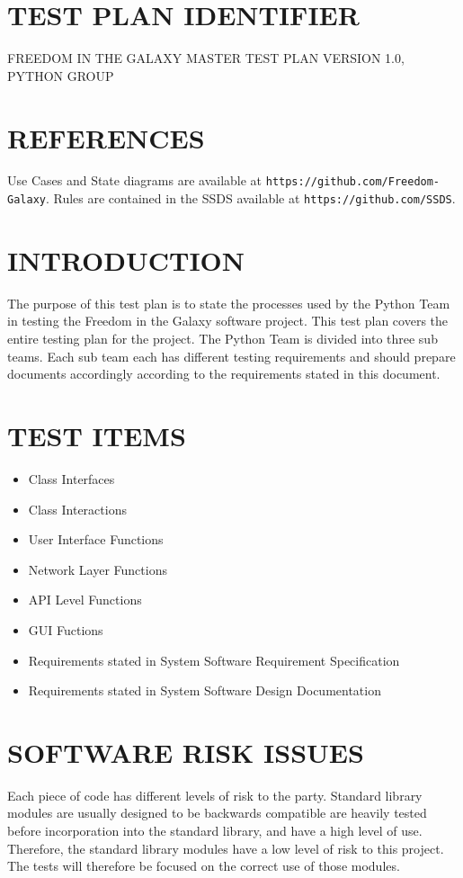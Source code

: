 \documentclass[report]{article}
\begin{document}
\section[IDENTIFIER]{TEST PLAN IDENTIFIER}
FREEDOM IN THE GALAXY MASTER TEST PLAN VERSION 1.0, PYTHON GROUP
\section[REFERENCES]{REFERENCES}
Use Cases and State diagrams are available at {\tt https://github.com/Freedom-Galaxy}. Rules are contained in the SSDS available at {\tt https://github.com/SSDS}.


\section[INTRODUCTION]{INTRODUCTION}
The purpose of this test plan is to state the processes used by the Python Team in testing the Freedom in the Galaxy software project. This test plan covers the entire testing plan for the project. The Python Team is divided into three sub teams. Each sub team each has different testing requirements and should prepare documents accordingly according to the requirements stated in this document.

\section[TEST ITEMS]{TEST ITEMS}
\begin{itemize}
\item Class Interfaces
\item Class Interactions
\item User Interface Functions
\item Network Layer Functions
\item API Level Functions
\item GUI Fuctions
\item Requirements stated in System Software Requirement Specification
\item Requirements stated in System Software Design Documentation
\end{itemize}

\section[SOFTWARE RISK ISSUES]{SOFTWARE RISK ISSUES}
\label{risk}
Each piece of code has different levels of risk to the party. Standard library modules are usually designed to be backwards compatible are heavily tested before incorporation into the standard library, and have a high level of use. Therefore, the standard library modules have a low level of risk to this project. The tests will therefore be focused on the correct use of those modules.
\end{document}
